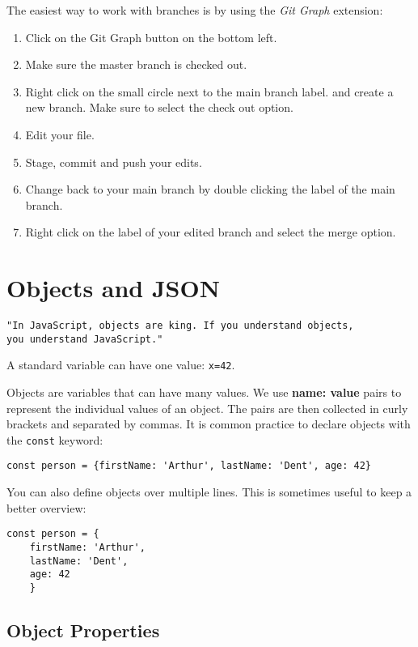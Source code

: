 \documentclass[11pt,a4paper]{report}
\begin{document}
The easiest way to work with branches is by using the \emph{Git Graph} extension:
\begin{enumerate}
\item Click on the Git Graph button on the bottom left.
\item Make sure the master branch is checked out.
\item Right click on the small circle next to the main branch label. and create a new branch. 
Make sure to select the check out option.
\item Edit your file.
\item Stage, commit and push your edits.
\item Change back to your main branch by double clicking the label of the main branch.
\item Right click on the label of your edited branch and select the merge option.
\end{enumerate}


\newpage


\section{Objects and JSON}

\begin{verbatim}
"In JavaScript, objects are king. If you understand objects, 
you understand JavaScript."
\end{verbatim}

A standard variable can have one value: \verb|x=42|.

Objects are variables that can have many values. We use {\bf name: value} pairs to represent the individual values of an object.  The pairs are then collected in curly brackets and separated by commas. It is common practice to declare objects with the \verb|const| keyword:

\verb|const person = {firstName: 'Arthur', lastName: 'Dent', age: 42}|

You can also define objects over multiple lines. This is sometimes useful to keep a better overview:
\begin{verbatim}
const person = {
	firstName: 'Arthur', 
	lastName: 'Dent', 
	age: 42
	}
\end{verbatim}

\subsection{Object Properties}
\end{document}
